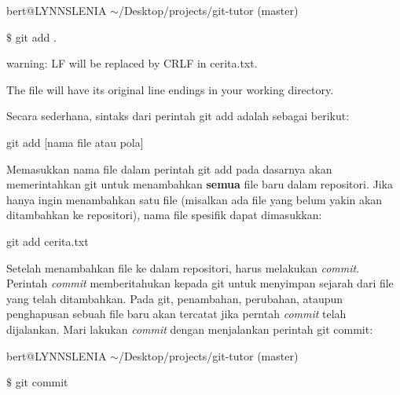 {\fontsize{10pt}{10pt}\selectfont bert@LYNNSLENIA  $  \sim  $/Desktop/projects/git-tutor (master)} \par
{\fontsize{10pt}{10pt}\selectfont  $  \$  $ git add .} \par
{\fontsize{10pt}{10pt}\selectfont warning: LF will be replaced by CRLF in cerita.txt.} \par
{\fontsize{10pt}{10pt}\selectfont The file will have its original line endings in your working directory.} \par
\noindent 
\vspace{12pt}
\noindent 

Secara sederhana, sintaks dari perintah git add adalah sebagai berikut: \par
{\fontsize{10pt}{10pt}\selectfont git add [nama file atau pola]} \par
\noindent 
\vspace{12pt}

\hspace*{0.50in} Memasukkan nama file dalam perintah git add pada dasarnya akan memerintahkan git untuk menambahkan \textbf{semua} file baru dalam repositori. Jika hanya ingin menambahkan satu file (misalkan ada file yang belum yakin akan ditambahkan ke repositori), nama file spesifik dapat dimasukkan: \par
{\fontsize{10pt}{10pt}\selectfont git add cerita.txt} \par

\vspace{12pt}
\hspace*{0.50in}Setelah menambahkan file ke dalam repositori, harus melakukan \emph{commit}. Perintah \emph{commit} memberitahukan kepada git untuk menyimpan sejarah dari file yang telah ditambahkan. Pada git, penambahan, perubahan, ataupun penghapusan sebuah file baru akan tercatat jika perntah \emph{commit} telah dijalankan. Mari lakukan \emph{commit} dengan menjalankan perintah git commit: \par
{\fontsize{10pt}{10pt}\selectfont bert@LYNNSLENIA  $  \sim  $/Desktop/projects/git-tutor (master)} \par
{\fontsize{10pt}{10pt}\selectfont  $  \$  $ git commit} \par
\vspace{12pt}

